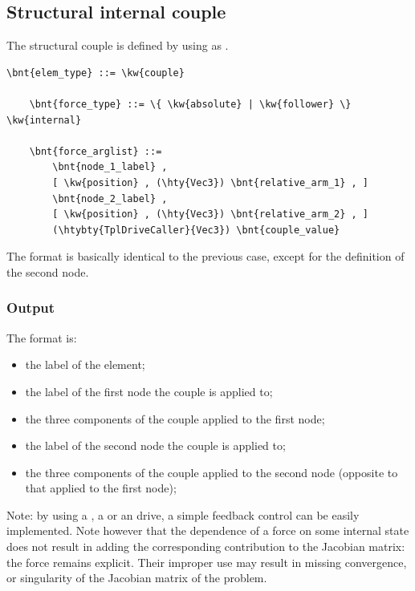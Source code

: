 \subsection{Structural internal couple}
\label{sec:EL:FORCE:STRUCTURAL:INTERNAL_COUPLE}
The structural couple is defined by using  as .
\begin{Verbatim}[commandchars=\\\{\}]
    \bnt{elem_type} ::= \kw{couple}

    \bnt{force_type} ::= \{ \kw{absolute} | \kw{follower} \} \kw{internal}

    \bnt{force_arglist} ::=
        \bnt{node_1_label} ,
        [ \kw{position} , (\hty{Vec3}) \bnt{relative_arm_1} , ]
        \bnt{node_2_label} ,
        [ \kw{position} , (\hty{Vec3}) \bnt{relative_arm_2} , ]
        (\htybty{TplDriveCaller}{Vec3}) \bnt{couple_value}
\end{Verbatim}
The format is basically identical to the previous case,
except for the definition of the second node.

\subsubsection{Output}
The format is:
\begin{itemize}
    \item the label of the element;
    \item the label of the first node the couple is applied to;
    \item the three components of the couple applied to the first node;
    \item the label of the second node the couple is applied to;
    \item the three components of the couple applied to the second node
	  (opposite to that applied to the first node);
\end{itemize}

\bigskip
Note: by using a , a  or an  drive,
a simple feedback control can be easily implemented.
Note however that the dependence of a force on some internal state
does not result in adding the corresponding contribution 
to the Jacobian matrix: the force remains explicit.
Their improper use may result in missing convergence,
or singularity of the Jacobian matrix of the problem.

